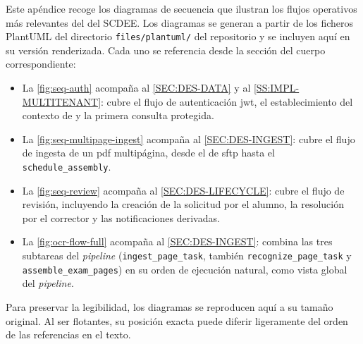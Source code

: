 Este apéndice recoge los diagramas de secuencia que ilustran los flujos
operativos más relevantes del  del SCDEE. Los diagramas se
generan a partir de los ficheros PlantUML del directorio
\texttt{files/plantuml/} del repositorio y se incluyen aquí en su
versión renderizada. Cada uno se referencia desde la sección del cuerpo
correspondiente:

\begin{itemize}
  \item La \cref{fig:seq-auth} acompaña al \cref{SEC:DES-DATA} y al
  \cref{SS:IMPL-MULTITENANT}: cubre el flujo de autenticación
  \acs{jwt}, el establecimiento del contexto de  y la
  primera consulta protegida.
  \item La \cref{fig:seq-multipage-ingest} acompaña al
  \cref{SEC:DES-INGEST}: cubre el flujo de ingesta de un \acs{pdf}
  multipágina, desde el  de \acs{sftp} hasta el
  \texttt{schedule\_assembly}.
  \item La \cref{fig:seq-review} acompaña al \cref{SEC:DES-LIFECYCLE}:
  cubre el flujo de revisión, incluyendo la creación de la solicitud
  por el alumno, la resolución por el corrector y las notificaciones
  derivadas.
  \item La \cref{fig:ocr-flow-full} acompaña al \cref{SEC:DES-INGEST}:
  combina las tres subtareas del \textit{pipeline}
  (\texttt{ingest\_page\_task}, también \texttt{recognize\_page\_task} y
  \texttt{assemble\_exam\_pages}) en su orden de ejecución natural,
  como vista global del \textit{pipeline}.
\end{itemize}

Para preservar la legibilidad, los diagramas se reproducen aquí a su
tamaño original. Al ser flotantes, su posición exacta puede diferir
ligeramente del orden de las referencias en el texto.
